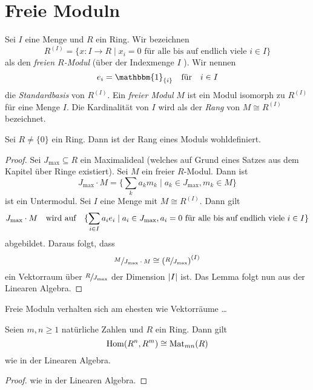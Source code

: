 \section{Freie Moduln}

\begin{definition}
	Sei $I$ eine Menge und $R$ ein Ring. Wir bezeichnen
	\[
		R^{(I)} = \{x : I \to R \mid x_{i} = 0 \text{ für alle bis auf endlich viele } i \in I\} 
	\] 
	als den \emph{freien $R$-Modul} (über der Indexmenge $I$ ). Wir nennen
	\[
		e_{i} = \mathbbm{1}_{\{i\}} \qq{für} i \in I
	\]
	die \emph{Standardbasis} von $R^{(I)}$.
	Ein \emph{freier Modul} $M$ ist ein Modul isomorph zu $R^{(I)}$ für eine Menge $I$.
	Die Kardinalität von $I$ wird als der \emph{Rang} von $M \cong R^{(I)}$ bezeichnet.
\end{definition}

\begin{lemma}
	Sei $R \neq \{0\} $ ein Ring. Dann ist der Rang eines Moduls wohldefiniert.
\end{lemma}

\begin{proof}
	Sei $J_{\max} \subseteq R$ ein Maximalideal (welches auf Grund eines Satzes aus dem Kapitel über Ringe existiert).
	Sei $M$ ein freier $R$-Modul. Dann ist
	\[
	J_{\max} \cdot M = \{\sum_{k} a_{k} m_{k} \mid a_{k} \in J_{\max}, m_{k} \in M\} 
	\] 
	ist ein Untermodul. Sei $I$ eine Menge mit  $M \cong R^{(I)}$. Dann gilt  
	\[
		J_{\max} \cdot M \qq{wird auf} \{\sum_{i \in I} a_{i} e_{i} \mid a_{i} \in J_{\max}, a_{i} = 0 \text{ für alle bis auf endlich viele } i \in I\}
	\]
	abgebildet. Daraus folgt, dass
	\[
		\sfrac{M}{J_{\max} \cdot M} \cong \left( \sfrac{R}{J_{\max}} \right)^{(I)}
	\] 
	ein Vektorraum über $\sfrac{R}{J_{\max}}$ der Dimension $\abs{I}$ ist. 
	Das Lemma folgt nun aus der Linearen Algebra.
\end{proof}

\begin{claim}
	Freie Moduln verhalten sich am ehesten wie Vektorräume \ldots
\end{claim}

\begin{proposition}
	Seien $m,n \geq 1$ natürliche Zahlen und $R$ ein Ring. Dann gilt
	\[
		\operatorname{Hom}(R^{n},R^{m}) \cong \operatorname{Mat}_{mn}(R)
	\] 
	wie in der Linearen Algebra.
\end{proposition}

\begin{proof}
	wie in der Linearen Algebra.
\end{proof}

